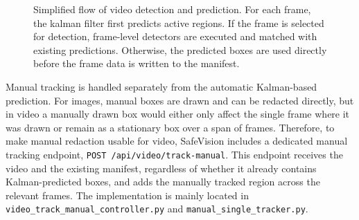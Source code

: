 \begin{figure}[H]
\centering
{}
\caption{Simplified flow of video detection and prediction. For each frame, the \gls{kalman filter} first predicts active regions. If the frame is selected for detection, frame-level detectors are executed and matched with existing predictions. Otherwise, the predicted boxes are used directly before the frame data is written to the manifest.}
\label{fig:video_tracking_flow}
\end{figure}


Manual tracking is handled separately from the automatic Kalman-based prediction. For images, manual boxes are drawn and can be redacted directly, but in video a manually drawn box would either only affect the single frame where it was drawn or remain as a stationary box over a span of frames. Therefore, to make manual redaction usable for video, \gls{SafeVision} includes a dedicated manual tracking endpoint, \texttt{POST /api/video/track-manual}. This endpoint receives the video and the existing manifest, regardless of whether it already contains Kalman-predicted boxes, and adds the manually tracked region across the relevant frames. The implementation is mainly located in \texttt{video\_track\_manual\_controller.py} and \texttt{manual\_single\_tracker.py}.

